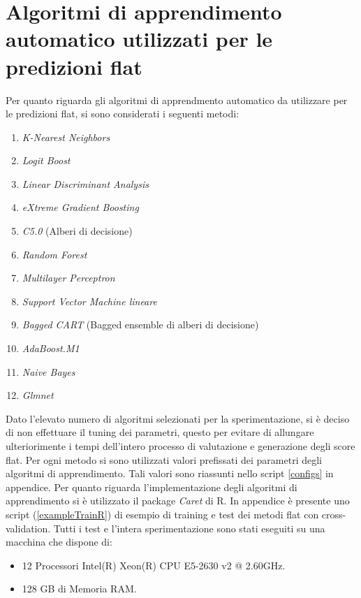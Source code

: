 \documentclass[12pt]{report}
\begin{document}
\section{Algoritmi di apprendimento automatico utilizzati per le predizioni flat}
Per quanto riguarda gli algoritmi di apprendmento automatico da utilizzare per le predizioni flat, si sono considerati i seguenti metodi:
\begin{enumerate}
\item \emph{K-Nearest Neighbors}\cite{KNN}
\item \emph{Logit Boost}\cite{LogitBoost}
\item \emph{Linear Discriminant Analysis}\cite{LDA}
\item \emph{eXtreme Gradient Boosting} \cite{xgbLinear}
\item \emph{C5.0} (Alberi di decisione)\cite{C5.0}
\item \emph{Random Forest}\cite{Ranger}
\item \emph{Multilayer Perceptron}\cite{mlp}
\item \emph{Support Vector Machine lineare}\cite{SVM}
\item \emph{Bagged CART} (Bagged ensemble di alberi di decisione) \cite{treebag}
\item \emph{AdaBoost.M1}\cite{adaboost}
\item \emph{Naive Bayes}\cite{naivebayes}
\item \emph{Glmnet}\cite{glmnet}
\end{enumerate}

Dato l'elevato numero di algoritmi selezionati per la sperimentazione, si è deciso di non effettuare il tuning dei parametri, questo per evitare di allungare ulteriorimente i tempi dell'intero processo di valutazione e generazione degli score flat.
\newline
\newline
Per ogni metodo si sono utilizzati valori prefissati dei parametri degli algoritmi di apprendimento. Tali valori sono riassunti nello script \ref{configs} in appendice.
\newline
\newline
Per quanto riguarda l'implementazione degli algoritmi di apprendimento si è utilizzato il package \emph{Caret}\cite{CARET} di R. In appendice è presente uno script (\ref{exampleTrainR}) di esempio di training e test dei metodi flat con cross-validation. 
\newline
\newline
Tutti i test e l'intera sperimentazione sono stati eseguiti su una macchina che dispone di:
\begin{itemize}
\item 12 Processori Intel(R) Xeon(R) CPU E5-2630 v2 @ 2.60GHz.
\item 128 GB di Memoria RAM.
\end{itemize}
\end{document}
